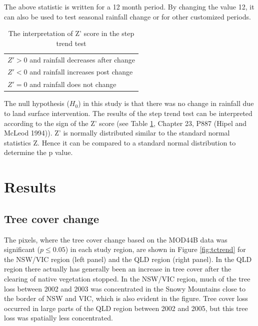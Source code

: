\documentclass[fleqn,10pt,lineno]{wlpeerj} %
\begin{document}
The above statistic is written for a 12 month period. By changing the
value 12, it can also be used to test seasonal rainfall change or for
other customized periods.

\begin{table}[t]

\caption{\label{tab:Zscore}The interpretation of Z' score in the step trend test}
\centering
\begin{tabular}{l}
\toprule
 \\
\midrule
$Z'>0$  and rainfall decreases after change\\
$Z'<0$ and rainfall increases post change\\
$Z'=0$ and rainfall does not change\\
\bottomrule
\end{tabular}
\end{table}

The null hypothesis (\(H_0\)) in this study is that there was no change
in rainfall due to land surface intervention. The results of the step
trend test can be interpreted according to the sign of the Z' score (see
Table \ref{tab:Zscore}, Chapter 23, P887 (Hipel and McLeod 1994)). Z' is
normally distributed similar to the standard normal statistics Z. Hence
it can be compared to a standard normal distribution to determine the p
value.

\section{Results}\label{results}

\subsection{Tree cover change}\label{tree-cover-change}

The pixels, where the tree cover change based on the MOD44B data was
significant (\(p \leq 0.05\)) in each study region, are shown in Figure
\ref{fig:tctrend} for the NSW/VIC region (left panel) and the QLD region
(right panel). In the QLD region there actually has generally been an
increase in tree cover after the clearing of native vegetation stopped.
In the NSW/VIC region, much of the tree loss between 2002 and 2003 was
concentrated in the Snowy Mountains close to the border of NSW and VIC,
which is also evident in the figure. Tree cover loss occurred in large
parts of the QLD region between 2002 and 2005, but this tree loss was
spatially less concentrated.
\end{document}
